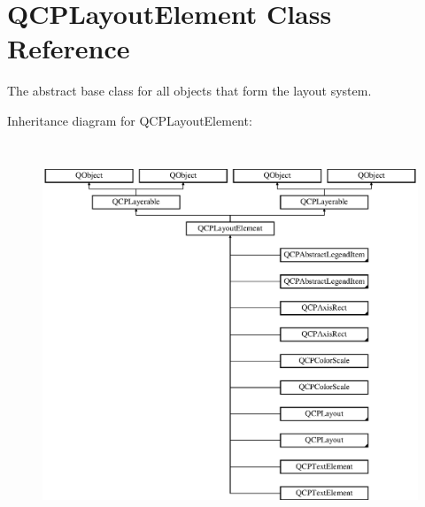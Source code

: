 \hypertarget{class_q_c_p_layout_element}{}\section{Q\+C\+P\+Layout\+Element Class Reference}
\label{class_q_c_p_layout_element}


The abstract base class for all objects that form the layout system.  


Inheritance diagram for Q\+C\+P\+Layout\+Element\+:\begin{figure}[H]
\begin{center}
\leavevmode
\includegraphics[height=11.518987cm]{class_q_c_p_layout_element}
\end{center}
\end{figure}
